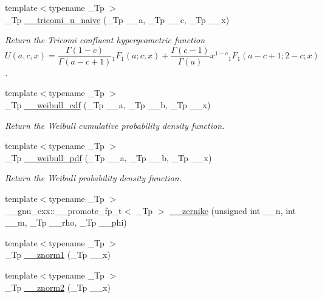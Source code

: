 \begin{DoxyCompactItemize}
{\footnotesize template$<$typename \+\_\+\+Tp $>$ }\\\+\_\+\+Tp \hyperlink{namespacestd_1_1____detail_adc131cec2eae93bacc28d6afd89def2f}{\+\_\+\+\_\+tricomi\+\_\+u\+\_\+naive} (\+\_\+\+Tp \+\_\+\+\_\+a, \+\_\+\+Tp \+\_\+\+\_\+c, \+\_\+\+Tp \+\_\+\+\_\+x)
\begin{DoxyCompactList}\small\item\em Return the Tricomi confluent hypergeometric function \[ U(a,c,x) = \frac{\Gamma(1-c)}{\Gamma(a-c+1)} {}_1F_1(a;c;x) + \frac{\Gamma(c-1)}{\Gamma(a)} x^{1-c} {}_1F_1(a-c+1;2-c;x) \]. \end{DoxyCompactList}\item 
{\footnotesize template$<$typename \+\_\+\+Tp $>$ }\\\+\_\+\+Tp \hyperlink{namespacestd_1_1____detail_aeb9a99b7ca44c9e403f78baf38dc293b}{\+\_\+\+\_\+weibull\+\_\+cdf} (\+\_\+\+Tp \+\_\+\+\_\+a, \+\_\+\+Tp \+\_\+\+\_\+b, \+\_\+\+Tp \+\_\+\+\_\+x)
\begin{DoxyCompactList}\small\item\em Return the Weibull cumulative probability density function. \end{DoxyCompactList}\item 
{\footnotesize template$<$typename \+\_\+\+Tp $>$ }\\\+\_\+\+Tp \hyperlink{namespacestd_1_1____detail_ab15a21521bc750303938a108c5a0bb0b}{\+\_\+\+\_\+weibull\+\_\+pdf} (\+\_\+\+Tp \+\_\+\+\_\+a, \+\_\+\+Tp \+\_\+\+\_\+b, \+\_\+\+Tp \+\_\+\+\_\+x)
\begin{DoxyCompactList}\small\item\em Return the Weibull probability density function. \end{DoxyCompactList}\item 
{\footnotesize template$<$typename \+\_\+\+Tp $>$ }\\\+\_\+\+\_\+gnu\+\_\+cxx\+::\+\_\+\+\_\+promote\+\_\+fp\+\_\+t$<$ \+\_\+\+Tp $>$ \hyperlink{namespacestd_1_1____detail_aa09d6c12ea20927f2ea5f7a1ba2f8319}{\+\_\+\+\_\+zernike} (unsigned int \+\_\+\+\_\+n, int \+\_\+\+\_\+m, \+\_\+\+Tp \+\_\+\+\_\+rho, \+\_\+\+Tp \+\_\+\+\_\+phi)
\item 
{\footnotesize template$<$typename \+\_\+\+Tp $>$ }\\\+\_\+\+Tp \hyperlink{namespacestd_1_1____detail_a6827b123253cc6a19947406339738bd7}{\+\_\+\+\_\+znorm1} (\+\_\+\+Tp \+\_\+\+\_\+x)
\item 
{\footnotesize template$<$typename \+\_\+\+Tp $>$ }\\\+\_\+\+Tp \hyperlink{namespacestd_1_1____detail_adf930b70ca943c6810ac7d2ea78d2cc3}{\+\_\+\+\_\+znorm2} (\+\_\+\+Tp \+\_\+\+\_\+x)
\end{DoxyCompactItemize}
